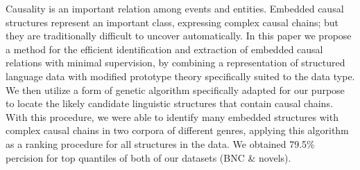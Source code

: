 Causality is an important relation among events and entities. Embedded causal structures represent an important class, expressing complex causal chains; but they are traditionally difficult to uncover automatically. In this paper we propose a method for the efficient identification and extraction of embedded causal relations with minimal supervision, by combining a representation of structured language data with modified prototype theory specifically suited to the data type. We then utilize a form of genetic algorithm specifically adapted for our purpose to locate the likely candidate linguistic structures that contain causal chains. With this procedure, we were able to identify many embedded structures with complex causal chains in two corpora of different genres, applying this algorithm as a ranking procedure for all structures in the data. We obtained 79.5\% percision for top quantiles of both of our datasets (BNC \& novels).
